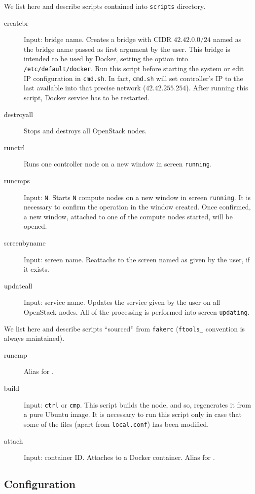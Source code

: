 We list here and describe scripts contained into \texttt{scripts} directory.
\begin{description}
	\item[createbr] Input: bridge name. Creates a bridge with CIDR $42.42.0.0/24$ named as the bridge name passed as first argument by the user. This bridge is intended to be used by Docker, setting the option  into \texttt{/etc/default/docker}. Run this script before starting the system or edit IP configuration in \texttt{cmd.sh}. In fact, \texttt{cmd.sh} will set controller's IP to the last available into that precise network ($42.42.255.254$). After running this script, Docker service has to be restarted.
	\item[destroyall] Stops and destroys all OpenStack nodes.
	\item[runctrl] Runs one controller node on a new window in screen \texttt{running}.
	\item[runcmps] Input: \texttt{N}. Starts \texttt{N} compute nodes on a new window in screen \texttt{running}. It is necessary to confirm the operation in the window created. Once confirmed, a new window, attached to one of the compute nodes started, will be opened.
	\item[screenbyname] Input: screen name. Reattachs to the screen named as given by the user, if it exists.
	\item[updateall] Input: service name. Updates the service given by the user on all OpenStack nodes. All of the processing is performed into screen \texttt{updating}.
\end{description}

We list here and describe scripts ``sourced'' from \texttt{fakerc} (\texttt{ftools\_} convention is always maintained).
\begin{description}
	\item[runcmp] Alias for .
	\item[build] Input: \texttt{ctrl} or \texttt{cmp}. This script builds the node, and so, regenerates it from a pure Ubuntu image. It is necessary to run this script only in case that some of the files (apart from \texttt{local.conf}) has been modified.
	\item[attach] Input: container ID. Attaches to a Docker container. Alias for .
\end{description}

\subsection{Configuration}
\label{sub:fakestack_conf}

